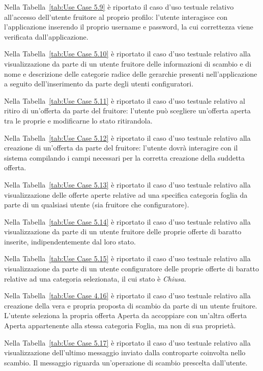 Nella Tabella~\ref{tab:Use Case 5.9} è riportato il caso d'uso testuale relativo all'accesso dell'utente fruitore al proprio profilo: l'utente interagisce con l'applicazione inserendo il proprio username e password, la cui correttezza viene verificata dall'applicazione.\bigskip

Nella Tabella~\ref{tab:Use Case 5.10} è riportato il caso d'uso testuale relativo alla visualizzazione da parte di un utente fruitore delle informazioni di scambio e di nome e descrizione delle categorie radice delle gerarchie presenti nell'applicazione a seguito dell'inserimento da parte degli utenti configuratori.\bigskip

Nella Tabella~\ref{tab:Use Case 5.11} è riportato il caso d'uso testuale relativo al ritiro di un'offerta da parte del fruitore: l'utente può scegliere un'offerta aperta tra le proprie e modificarne lo stato ritirandola.\bigskip

Nella Tabella~\ref{tab:Use Case 5.12} è riportato il caso d'uso testuale relativo alla creazione di un'offerta da parte del fruitore: l'utente dovrà interagire con il sistema compilando i campi necessari per la corretta creazione della suddetta offerta.\bigskip

Nella Tabella~\ref{tab:Use Case 5.13} è riportato il caso d'uso testuale relativo alla visualizzazione delle offerte aperte relative ad una specifica categoria foglia da parte di un qualsiasi utente (sia fruitore che configuratore).\bigskip

Nella Tabella~\ref{tab:Use Case 5.14} è riportato il caso d'uso testuale relativo alla visualizzazione da parte di un utente fruitore delle proprie offerte di baratto inserite, indipendentemente dal loro stato.\bigskip

Nella Tabella~\ref{tab:Use Case 5.15} è riportato il caso d'uso testuale relativo alla visualizzazione da parte di un utente configuratore delle proprie offerte di baratto relative ad una categoria selezionata, il cui stato è \textit{Chiusa}.\bigskip

Nella Tabella~\ref{tab:Use Case 4.16} è riportato il caso d'uso testuale relativo alla creazione della vera e propria proposta di scambio da parte di un utente fruitore. L'utente seleziona la propria offerta Aperta da accoppiare con un'altra offerta Aperta appartenente alla stessa categoria Foglia, ma non di sua proprietà.\bigskip

Nella Tabella~\ref{tab:Use Case 5.17} è riportato il caso d'uso testuale relativo alla visualizzazione dell'ultimo messaggio inviato dalla controparte coinvolta nello scambio. Il messaggio riguarda un'operazione di scambio prescelta dall'utente.\bigskip

